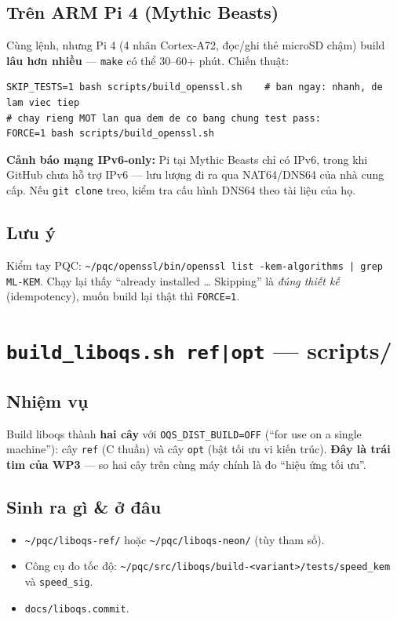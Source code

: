 \documentclass[11pt,a4paper]{article}
\begin{document}
\subsection*{Trên ARM Pi 4 (Mythic Beasts)}
Cùng lệnh, nhưng Pi 4 (4 nhân Cortex-A72, đọc/ghi thẻ microSD chậm) build \textbf{lâu hơn nhiều} — \verb|make| có thể 30–60+ phút. Chiến thuật:
\begin{lstlisting}
SKIP_TESTS=1 bash scripts/build_openssl.sh    # ban ngay: nhanh, de lam viec tiep
# chay rieng MOT lan qua dem de co bang chung test pass:
FORCE=1 bash scripts/build_openssl.sh
\end{lstlisting}
\textbf{Cảnh báo mạng IPv6-only:} Pi tại Mythic Beasts chỉ có IPv6, trong khi GitHub chưa hỗ trợ IPv6 — lưu lượng đi ra qua NAT64/DNS64 của nhà cung cấp. Nếu \verb|git clone| treo, kiểm tra cấu hình DNS64 theo tài liệu của họ.

\subsection*{Lưu ý}
Kiểm tay PQC: \verb!~/pqc/openssl/bin/openssl list -kem-algorithms | grep ML-KEM!. Chạy lại thấy ``already installed … Skipping'' là \emph{đúng thiết kế} (idempotency), muốn build lại thật thì \verb|FORCE=1|.

\section{\texttt{build\_liboqs.sh ref|opt} — \textmd{\normalsize scripts/}}
\label{sec:liboqs}

\subsection*{Nhiệm vụ}
Build liboqs thành \textbf{hai cây} với \verb|OQS_DIST_BUILD=OFF| (``for use on a single machine''): cây \verb|ref| (C thuần) và cây \verb|opt| (bật tối ưu vi kiến trúc). \textbf{Đây là trái tim của WP3} — so hai cây trên cùng máy chính là đo ``hiệu ứng tối ưu''.

\subsection*{Sinh ra gì \& ở đâu}
\begin{itemize}
  \item \verb|~/pqc/liboqs-ref/| hoặc \verb|~/pqc/liboqs-neon/| (tùy tham số).
  \item Công cụ đo tốc độ: \verb|~/pqc/src/liboqs/build-<variant>/tests/speed_kem| và \verb|speed_sig|.
  \item \verb|docs/liboqs.commit|.
\end{itemize}
\end{document}
